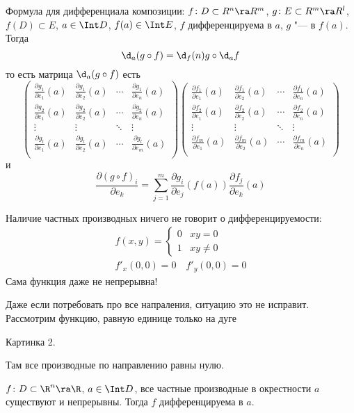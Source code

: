 \begin{conseq}
	Формула для дифференциала композиции:
	$f\colon D \subset R^n \ra R^m$, $g\colon E \subset R^m \ra R^l$, $f(D) \subset E$, $a \in \Int D$, $f(a) \in \Int E$,
	$f$ дифференцируема в $a$, $g$ "--- в $f(a)$.
	Тогда
	\[ \d_a(g \circ f) = \d_f(n) g \circ \d_a f \]
	то есть матрица $\d_a (g \circ f)$ есть
	\[\left(\begin{matrix}
		\frac{\partial g_1}{\partial e_1}(a) & \frac{\partial g_1}{\partial e_2}(a)
			&\cdots& \frac{\partial g_1}{\partial e_n}(a) \\
		\frac{\partial g_2}{\partial e_1}(a) & \frac{\partial g_2}{\partial e_2}(a) 
			&\cdots& \frac{\partial g_2}{\partial e_n}(a) \\
		\vdots & \vdots & \ddots & \vdots \\
		\frac{\partial g_l}{\partial e_1}(a) & \frac{\partial g_l}{\partial e_2}(a) 
			&\cdots& \frac{\partial g_l}{\partial e_m}(a) \\
	\end{matrix}\right)\left(\begin{matrix}
		\frac{\partial f_1}{\partial e_1}(a) & \frac{\partial f_1}{\partial e_2}(a)
			&\cdots& \frac{\partial f_1}{\partial e_n}(a) \\
		\frac{\partial f_2}{\partial e_1}(a) & \frac{\partial f_2}{\partial e_2}(a) 
			&\cdots& \frac{\partial f_2}{\partial e_n}(a) \\
		\vdots & \vdots & \ddots & \vdots \\
		\frac{\partial f_m}{\partial e_1}(a) & \frac{\partial f_m}{\partial e_2}(a) 
			&\cdots& \frac{\partial f_m}{\partial e_n}(a) \\
	\end{matrix}\right)\]
	и
	\[ \frac{\partial (g \circ f)_i}{\partial e_k} = \sum_{j = 1}^m \frac{\partial g_i}{\partial e_j} (f(a)) \frac{\partial f_j}{\partial e_k} (a) \]
\end{conseq}

\begin{Rem}
	Наличие частных производных ничего не говорит о дифференцируемости:
	\begin{gather*}
		f(x, y) = \begin{cases} 0 & xy = 0 \\ 1 & xy \ne 0 \end{cases} \\
		f'_x(0, 0) = 0 \quad f'_y(0, 0) = 0
	\end{gather*}
	Сама функция даже не непрерывна!

	Даже если потребовать про все напраления, ситуацию это не исправит. Рассмотрим функцию, равную единице только на дуге

	Картинка 2.

	Там все производные по направлению равны нулю.
\end{Rem}

\begin{theorem}
	$f\colon D \subset \R^n \ra \R$, $a \in \Int D$, все частные производные в окрестности $a$ существуют и непрерывны.
	Тогда $f$ дифференцируема в $a$.
\end{theorem}